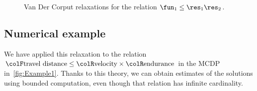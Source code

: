 \begin{figure}[h]
    \begin{centering}
        \par
    \end{centering}
    \caption{\label{fig:approx_invmult}Van Der Corput relaxations for the relation
        $\fun_{1}\leq\res_{1}\res_{2}$.}
\end{figure}

\subsection{Numerical example}

We have applied this relaxation to the relation ${\colF\text{travel distance}}\leq{\colR\text{velocity}}\times{\colR\text{endurance}}$
in the MCDP in~\cref{fig:Example1}. Thanks to this theory,
we can obtain estimates of the solutions using bounded computation,
even though that relation has infinite cardinality.

